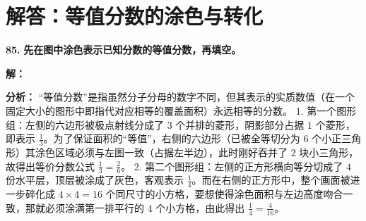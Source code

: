 \section{解答：等值分数的涂色与转化}

\vspace{0.6cm}

\textbf{\LARGE 85.} \textbf{先在图中涂色表示已知分数的等值分数，再填空。}

\vspace{0.4cm}
\textbf{解：}

\textbf{分析：}
“等值分数”是指虽然分子分母的数字不同，但其表示的实质数值（在一个固定大小的图形中即指代对应相等的覆盖面积）永远相等的分数。
1. 第一个图形组：左侧的六边形被极点射线分成了 $3$ 个并排的菱形，阴影部分占据 $1$ 个菱形，即表示 $\displaystyle\frac{1}{3}$。为了保证面积的“等值”，右侧的六边形（已被全等切分为 $6$ 个小正三角形）其涂色区域必须与左图一致（占据左半边），此时刚好吞并了 $2$ 块小三角形，故得出等价分数公式 $\displaystyle\frac{1}{3} = \frac{2}{6}$。
2. 第二个图形组：左侧的正方形横向等分切成了 $4$ 份水平层，顶层被涂成了灰色，客观表示 $\displaystyle\frac{1}{4}$。而在右侧的正方形中，整个画面被进一步碎化成 $4 \times 4 = 16$ 个同尺寸的小方格，要想使得涂色面积与左边高度吻合一致，那就必须涂满第一排平行的 $4$ 个小方格，由此得出 $\displaystyle\frac{1}{4} = \frac{4}{16}$。

